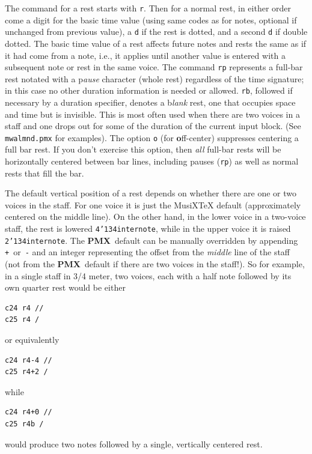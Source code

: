 \documentclass[11pt]{article}
\def\MusiXTeX{MusiX\TeX}
\def\bs{{\tt\char'134}}
\newcommand\PMXX{\textbf{PMX}}
\newcommand\PMX{\PMXX~}
\def\newfrom{2.59}  %
\def\NEW#1{\ifdim#1 pt<\newfrom pt\else%
\marginpar{\fbox{#1}}\fi}
\begin{document}
	The command for a rest starts with {\tt r}.  
Then for a normal rest, in either order come a digit for the basic time value 
(using same codes as for notes, optional if unchanged from previous value),  
a {\tt d} if the rest is dotted, and a second {\tt d} if double dotted.
\NEW{2.0} The basic time value of a rest 
affects future notes and rests the same as if it had come from a note, 
i.e., it applies until another value is entered with a subsequent note 
or rest in the same voice.  The command {\tt rp} represents a 
full-bar rest notated with a {\bfi p}{\it ause} character (whole rest) 
regardless of 
the time signature; in this case no other duration information is 
needed or allowed.  {\tt rb}, followed if necessary by a duration 
specifier, denotes a {\bfi b}{\it lank} rest, one that occupies space and time 
but is invisible. This is most often used when there are
two voices in a staff and one drops out for some of the duration
of the current input block.  (See {\tt mwalmnd.pmx} for examples).  
\NEW{1.4} The 
option {\tt o} (for {\bf o}ff-center) suppresses centering a full bar rest.  If
you don't exercise this option, then 
{\it all} full-bar rests will be horizontally centered between bar 
lines, including pauses ({\tt rp}) as well as normal rests that fill the bar. 

	The default vertical position of a rest depends on whether there
are one or two voices in the staff. 
For one voice it is just the \MusiXTeX{} default 
(approximately centered on the middle line).  On the other hand, in  
the lower voice in 
a two-voice staff, the rest is lowered {\tt 4\bs internote}, while 
in the upper voice it is raised {\tt 2\bs internote}.  The \PMX default can be 
manually overridden by appending {\tt +}~or~{\tt -} and an integer 
representing the offset from the {\it middle} line of the staff 
(not from the \PMX default if there are two voices in the staff!).  
So for example, in a single staff 
in 3/4 meter, two voices, each with a half note followed by its own
quarter rest would be either 
\begin{verbatim}
c24 r4 //
c25 r4 / 
\end{verbatim}
or equivalently
\begin{verbatim}
c24 r4-4 //
c25 r4+2 / 
\end{verbatim}
while
\begin{verbatim}
c24 r4+0 //
c25 r4b /
\end{verbatim}
would produce two notes followed by a single, vertically centered rest.
\end{document}
